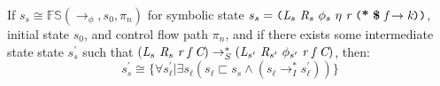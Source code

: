%

\begin{lemma}
\label{lem:init}
If $s_s \cong \mathbb{FS}(\rightarrow_{\phi},s_0,\pi_n)$ for symbolic state $s_s = \lp \cfgnt{L}_s\ \cfgnt{R}_{s}\ \phi_s\ \eta\ \cfgnt{r}\ \lp \cfgt{*}\ \cfgt{\$}\ \cfgnt{f} \rightarrow \cfgnt{k}\rp \rp$, initial state $s_0$, and control flow path $\pi_n$, and if there exists some intermediate state state $s_s^\prime$ such that $(\cfgnt{L}_s\ \cfgnt{R}_{s}\ \cfgnt{r}\ \cfgnt{f} \ \cfgnt{C}) \rightarrow_S^* (\cfgnt{L}_{s^\prime}\ \cfgnt{R}_{s^\prime}\ \phi_{s^\prime}\ \cfgnt{r}\ \cfgnt{f} \ \cfgnt{C})$, then:
 $$s_s^\prime \cong \{\forall s_\ell^\prime | \exists s_\ell (s_\ell \sqsubset s_s \wedge (s_\ell \rightarrow_I^* s_\ell^\prime) ) \}$$
\end{lemma}

